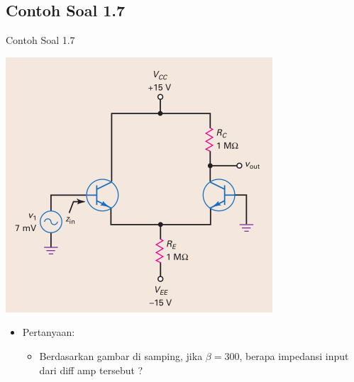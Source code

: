 \documentclass[aspectratio=169]{beamer}
\begin{document}
\subsection{Contoh Soal 1.7}
\begin{frame}{Contoh Soal 1.7}
	\begin{multicols}{2}
		\begin{center}
			\includegraphics[height=0.7\textheight]{gambar/01.contoh_soal_07}
		\end{center}
		\columnbreak
		\begin{itemize}
			\item Pertanyaan:
			\begin{itemize}
				\item Berdasarkan gambar di samping, jika $ \beta = 300 $, berapa impedansi input dari diff amp tersebut ?
			\end{itemize}
		\end{itemize}
	\end{multicols}
\end{frame}
\end{document}
